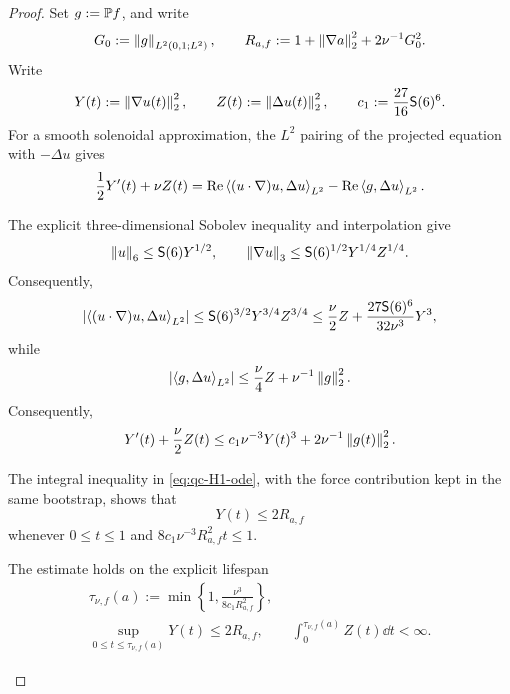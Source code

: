 \begin{proof}
Set \(g:=\mathbb P f\), and write
\[
 G_0:=\left\lVert g\right\rVert_{L^2(0,1;L^2)},
 \qquad
 R_{a,f}:=1+\left\lVert \nabla a\right\rVert_2^2+2\nu^{-1}G_0^2.
\]
Write
\[
 Y(t):=\left\lVert \nabla u(t)\right\rVert_2^2,
 \qquad
 Z(t):=\left\lVert \Delta u(t)\right\rVert_2^2,
 \qquad
 c_1:=\frac{27}{16}\mathsf S(6)^6.
\]
For a smooth solenoidal approximation, the \(L^2\) pairing of the projected
equation with \(-\Delta u\) gives
\begin{equation}
 \frac12Y'(t)+\nu Z(t)
 =\operatorname{Re}\left\langle (u\cdot\nabla)u,\Delta u\right\rangle_{L^2}
 -\operatorname{Re}\left\langle g,\Delta u\right\rangle_{L^2}.
 \label{eq:qc-H1-energy-pairing}
\end{equation}
\begin{samepage}
The explicit three-dimensional Sobolev inequality and interpolation give
\[
 \left\lVert u\right\rVert_6\le\mathsf S(6)Y^{1/2},
 \qquad
 \left\lVert \nabla u\right\rVert_3
 \le\mathsf S(6)^{1/2}Y^{1/4}Z^{1/4}.
\]
Consequently,
\[
 \left|\left\langle (u\cdot\nabla)u,\Delta u\right\rangle_{L^2}\right|
 \le \mathsf S(6)^{3/2}Y^{3/4}Z^{3/4}
 \le\frac\nu2Z+\frac{27\mathsf S(6)^6}{32\nu^3}Y^3,
\]
while
\[
 \left|\left\langle g,\Delta u\right\rangle_{L^2}\right|
 \le\frac\nu4Z+\nu^{-1}\left\lVert g\right\rVert_2^2.
\]
Consequently,
\begin{equation}
 Y'(t)+\frac\nu2 Z(t)
 \le c_1\nu^{-3}Y(t)^3+2\nu^{-1}\left\lVert g(t)\right\rVert_2^2.
 \label{eq:qc-H1-ode}
\end{equation}
\par
\end{samepage}
\begin{samepage}
The integral inequality in \eqref{eq:qc-H1-ode}, with the force contribution
kept in the same bootstrap, shows that
\begin{equation}
 Y(t)\le2R_{a,f}
 \label{eq:qc-H1-local-explicit}
\end{equation}
whenever \(0\le t\le1\) and
\(8c_1\nu^{-3}R_{a,f}^2t\le1\).
\par
\end{samepage}
\begin{samepage}
The estimate holds on the explicit lifespan
\begin{equation}
 \begin{aligned}
 \tau_{\nu,f}(a):=
 \min\left\{1,
 \frac{\nu^3}{8c_1R_{a,f}^2}
 \right\},\\
 \sup_{0\le t\le\tau_{\nu,f}(a)}Y(t)\le2R_{a,f},
 \qquad
 \int_0^{\tau_{\nu,f}(a)}Z(t)\dd t<\infty.
 \end{aligned}
 \label{eq:qc-H1-local-lifespan}
\end{equation}
\par
\end{samepage}

\end{proof}

